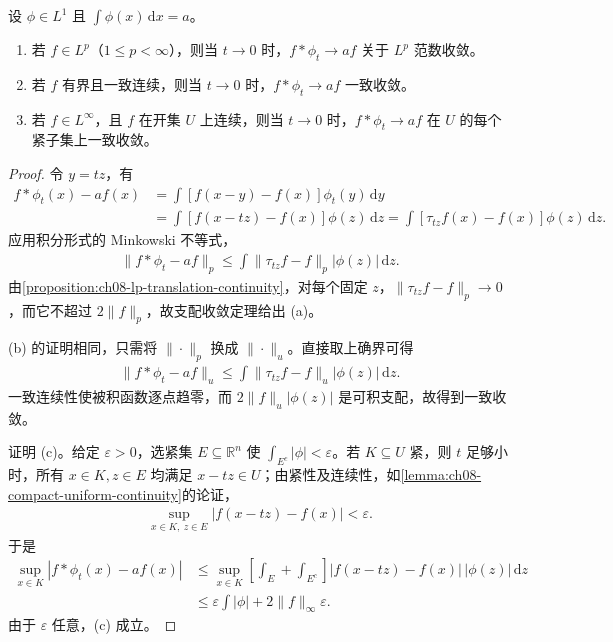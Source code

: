 \documentclass[../../main.tex]{subfiles}
\begin{document}
\begin{theorem}\label{theorem:ch08-approximate-identity-convergence}
设 $\phi\in L^1$ 且 $\int\phi(x)\,\mathrm dx=a$。
\begin{enumerate}
\item\label{item:ch08-approximate-lp}若 $f\in L^p$（$1\leqslant p<\infty$），则当 $t\to0$ 时，$f*\phi_t\to af$ 关于 $L^p$ 范数收敛。
\item\label{item:ch08-approximate-uniform}若 $f$ 有界且一致连续，则当 $t\to0$ 时，$f*\phi_t\to af$ 一致收敛。
\item\label{item:ch08-approximate-local-uniform}若 $f\in L^\infty$，且 $f$ 在开集 $U$ 上连续，则当 $t\to0$ 时，$f*\phi_t\to af$ 在 $U$ 的每个紧子集上一致收敛。
\end{enumerate}
\end{theorem}
\begin{proof}
令 $y=tz$，有
\begin{align*}
f*\phi_t(x)-af(x)
&=\int[f(x-y)-f(x)]\phi_t(y)\,\mathrm dy\\
&=\int[f(x-tz)-f(x)]\phi(z)\,\mathrm dz
=\int[\tau_{tz}f(x)-f(x)]\phi(z)\,\mathrm dz.
\end{align*}
应用积分形式的 Minkowski 不等式，
\begin{align*}
\|f*\phi_t-af\|_p\leqslant
\int\|\tau_{tz}f-f\|_p|\phi(z)|\,\mathrm dz.
\end{align*}
由\cref{proposition:ch08-lp-translation-continuity}，对每个固定 $z$，$\|\tau_{tz}f-f\|_p\to0$，而它不超过 $2\|f\|_p$，故支配收敛定理给出 (a)。

(b) 的证明相同，只需将 $\|\cdot\|_p$ 换成 $\|\cdot\|_u$。直接取上确界可得
\begin{align*}
\|f*\phi_t-af\|_u\leqslant
\int\|\tau_{tz}f-f\|_u|\phi(z)|\,\mathrm dz.
\end{align*}
一致连续性使被积函数逐点趋零，而 $2\|f\|_u|\phi(z)|$ 是可积支配，故得到一致收敛。

证明 (c)。给定 $\varepsilon>0$，选紧集 $E\subseteq\mathbb R^n$ 使 $\int_{E^c}|\phi|<\varepsilon$。若 $K\subseteq U$ 紧，则 $t$ 足够小时，所有 $x\in K,z\in E$ 均满足 $x-tz\in U$；由紧性及连续性，如\cref{lemma:ch08-compact-uniform-continuity}的论证，
\begin{align*}
\sup_{x\in K,\ z\in E}|f(x-tz)-f(x)|<\varepsilon.
\end{align*}
于是
\begin{align*}
\sup_{x\in K}|f*\phi_t(x)-af(x)|
&\leqslant\sup_{x\in K}
\left[\int_E+\int_{E^c}\right]
|f(x-tz)-f(x)|\,|\phi(z)|\,\mathrm dz\\
&\leqslant\varepsilon\int|\phi|+2\|f\|_\infty\varepsilon.
\end{align*}
由于 $\varepsilon$ 任意，(c) 成立。
\end{proof}
\end{document}
